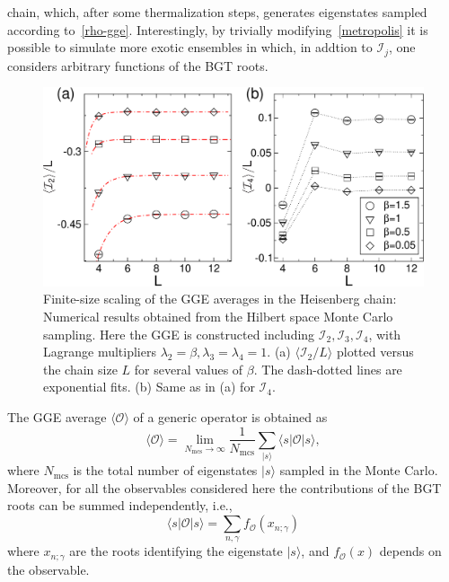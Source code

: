 \documentclass[twocolumn,superscriptaddress,prb,10pt]{revtex4-1}
\begin{document}
chain, which, after some thermalization steps, generates eigenstates sampled according 
to~\eqref{rho-gge}. Interestingly, by trivially modifying~\eqref{metropolis} it is possible to 
simulate more exotic ensembles in which, in addtion to ${\mathcal I}_j$, one considers 
arbitrary functions of the BGT roots.  
%
\begin{figure}[t]
\includegraphics*[width=0.93\linewidth]{./draft_figs/fig3}
\caption{Finite-size scaling of the GGE averages in the Heisenberg chain: Numerical results 
 obtained from the Hilbert space Monte Carlo sampling. Here the GGE is constructed including 
 ${\mathcal I}_2, {\mathcal I}_3, {\mathcal I}_4$, with Lagrange multipliers $\lambda_2=\beta,
 \lambda_3=\lambda_4=1$. (a) $\langle {\mathcal I}_2/L\rangle$ plotted versus the chain size 
 $L$ for several values of $\beta$. The dash-dotted lines are exponential fits. (b) Same as 
 in (a) for ${\mathcal I}_4$.
}
\label{fig2}
\end{figure}
%
The GGE average $\langle{\mathcal O}\rangle$ of a generic operator is obtained as  
%
\begin{equation}
\label{gge-mc}
\langle{\mathcal O}\rangle=\lim\limits_{N_\textrm{mcs}\to\infty}\frac{1}
{N_\textrm{mcs}}\sum\limits_{|s\rangle}\langle s|{\mathcal O}
|s\rangle,
\end{equation}
%
where $N_{\textrm{mcs}}$ is the total number of eigenstates $|s\rangle$ sampled in 
the Monte Carlo. Moreover, for all the observables considered here the contributions 
of the BGT roots can be summed independently, i.e., 
%
\begin{equation}
\label{gge-mc-1}
\langle s|{\mathcal O}|s\rangle=\sum\limits_{n,\gamma}f_{{\mathcal O}}(x_{n;\gamma})
\end{equation}
%
where $x_{n;\gamma}$ are the roots identifying the eigenstate $|s\rangle$, and 
$f_{{\mathcal O}}(x)$ depends on the observable. 
\end{document}
